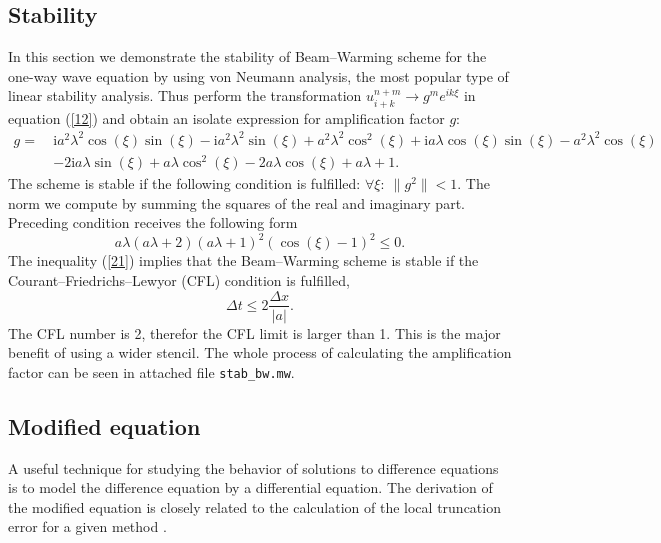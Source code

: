 \documentclass[a4paper, 10pt]{article}
\begin{document}
\subsection{Stability}
In this section we demonstrate the stability of Beam--Warming scheme for the one-way wave equation by using von Neumann analysis, the most popular type of linear stability analysis. Thus perform the transformation $ u_{i+k}^{n+m} \rightarrow g^m e^{ik\xi} $ in equation (\ref{12}) and obtain an isolate expression for amplification factor $ g $:
\begin{equation}
\begin{split}
\label{20}
g = \:& \mathrm{i} a^2 \lambda^2 \cos(\xi) \sin(\xi) - \mathrm{i} a^2 \lambda^2 \sin(\xi) + a^2 \lambda^2 \cos^2(\xi) + \mathrm{i} a \lambda \cos(\xi) \sin(\xi) - a^2 \lambda^2 \cos(\xi)\\ 
& - 2 \mathrm{i} a \lambda \sin(\xi) + a \lambda \cos^2(\xi) - 2 a \lambda \cos(\xi) + a \lambda + 1.
\end{split}
\end{equation}
The scheme is stable if the following condition is fulfilled: $ \forall \xi : \: \| g^2 \| < 1 $. The norm we compute by summing the squares of the real and imaginary part. Preceding condition receives the following form
\begin{equation}
\label{21}
a \lambda (a \lambda + 2) (a \lambda + 1)^2 (\cos(\xi) - 1)^2 \leq 0.
\end{equation}
The inequality (\ref{21}) implies that the Beam--Warming scheme is stable if the Courant--Friedrichs--Lewyor (CFL) condition is fulfilled,
\begin{equation}
\label{22}
\Delta t \leq 2 \frac{\Delta x}{| a |}.
\end{equation}
The CFL number is 2, therefor the CFL limit is larger than 1. This is the major benefit of using a wider stencil. The whole process of calculating the amplification factor can be seen in attached file \texttt{stab\_bw.mw}.

\subsection{Modified equation}
A useful technique for studying the behavior of solutions to difference equations is to model the difference equation by a differential equation. The derivation of the modified equation is closely related to the calculation of the local truncation error for a given method \cite{leveque}.\\
\end{document}
